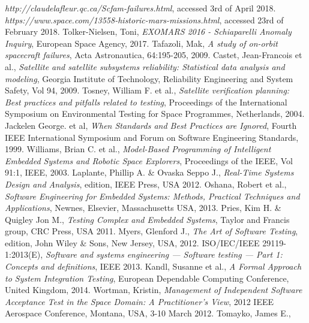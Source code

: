 \documentclass[english,12pt,a4paper,pdftex,elec,utf8]{aaltothesis}
\begin{document}
\begin{thebibliography}{99}
  \textit{http://claudelafleur.qc.ca/Scfam-failures.html}, accessed 3rd of April 2018. 
  \textit{https://www.space.com/13558-historic-mars-missions.html}, accessed 23rd of February 2018.
 Tolker-Nielsen, Toni,
  \textit{EXOMARS 2016 - Schiaparelli Anomaly Inquiry}, European Space Agency, 2017.
 Tafazoli, Mak,
  \textit{A study of on-orbit spacecraft failures}, Acta Astronautica, 64:195-205, 2009.
 Castet, Jean-Francois et al.,
  \textit{Satellite and satellite subsystems reliability: Statistical data analysis
and modeling}, Georgia Institute of Technology, Reliability Engineering and System Safety, Vol 94, 2009.
 Tosney, William F. et al.,
  \textit{Satellite verification planning: Best practices and pitfalls related to testing}, Proceedings of the  International Symposium on Environmental Testing for Space Programmes, Netherlands, 2004.
 Jackelen George. et al,
  \textit{When Standards and Best Practices are Ignored}, Fourth IEEE International Symposium and Forum on Software Engineering Standards, 1999.
 Williams, Brian C. et al.,
  \textit{Model-Based Programming of Intelligent
Embedded Systems and Robotic Space Explorers}, Proceedings of the IEEE, Vol 91:1, IEEE, 2003.
 Laplante, Phillip A. \& Ovaska Seppo J.,
  \textit{Real-Time Systems Design and Analysis},  edition, IEEE Press, USA 2012.
 Oshana, Robert et al.,
  \textit{Software Engineering for Embedded Systems: Methods, Practical Techniques and Applications}, Newnes, Elsevier, Massachusetts USA, 2013.
 Pries, Kim H. \& Quigley Jon M.,
  \textit{Testing Complex and Embedded Systems}, Taylor and Francis group, CRC Press, USA 2011.
 Myers, Glenford J.,
  \textit{The Art of Software Testing},  edition, John Wiley \& Sons, New Jersey, USA, 2012.
 ISO/IEC/IEEE 29119-1:2013(E),
  \textit{Software and systems engineering — Software testing — Part 1: Concepts and definitions}, IEEE 2013.
 Kandl, Susanne et al.,
  \textit{A Formal Approach to System Integration Testing}, European Dependable Computing Conference, United Kingdom, 2014.   
 Wortman, Kristin,
  \textit{Management of Independent Software Acceptance Test in the Space Domain: A Practitioner's View}, 2012 IEEE Aerospace Conference, Montana, USA, 3-10 March 2012.
 Tomayko, James E.,

\end{thebibliography}
\end{document}
